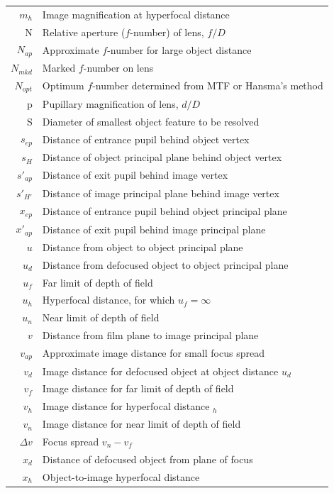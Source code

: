 \documentclass[11pt, oneside]{scrartcl}   	%
\newcommand{\Dv}{\ensuremath{\Delta v}}
\begin{document}
\begin{center}
{\begin{tabular}{r@{~=~}l}
$m_{h}$ & Image magnification at hyperfocal distance     \\
N & Relative aperture ($f$-number) of lens, $f/D$     \\
$N_{ap}$ & Approximate $f$-number for large object distance     \\
$N_{mkd}$ & Marked $f$-number on lens     \\
$N_{opt}$ & Optimum $f$-number determined from MTF or Hansma’s method     \\
p & Pupillary magnification of lens, $d/D$     \\
S & Diameter of smallest object feature to be resolved      \\
$s_{ep}$ & Distance of entrance pupil behind object vertex     \\
$s_{H}$ & Distance of object principal plane behind object vertex      \\
$s'_{ap}$ & Distance of exit pupil behind image vertex     \\
$s'_{H'}$ & Distance of image principal plane behind image vertex     \\
$x_{ep }$& Distance of entrance pupil behind object principal plane      \\
$x'_{ap}$ & Distance of exit pupil behind image principal plane     \\
$u$ & Distance from object to object principal plane     \\
$u_d$ & Distance from defocused object to object principal plane     \\
$u_f$ & Far limit of depth of field     \\
$u_h$ & Hyperfocal distance, for which $u_f = \infty$      \\
$u_n$ & Near limit of depth of field     \\
$v$ & Distance from film plane to image principal plane      \\
$v_{ap}$ & Approximate image distance for small focus spread     \\
$v_d$ & Image distance for defocused object at object distance $u_d$      \\
$v_f$ & Image distance for far limit of depth of field     \\
$v_h$ & Image distance for hyperfocal distance $_h$     \\
$v_n$ & Image distance for near limit of depth of field      \\
$\Dv$ & Focus spread $v_n - v_f$     \\
$x_d$ & Distance of defocused object from plane of focus      \\
$x_h$ & Object-to-image hyperfocal distance     \\
\end{tabular}
}
\end{center}
\end{document}
